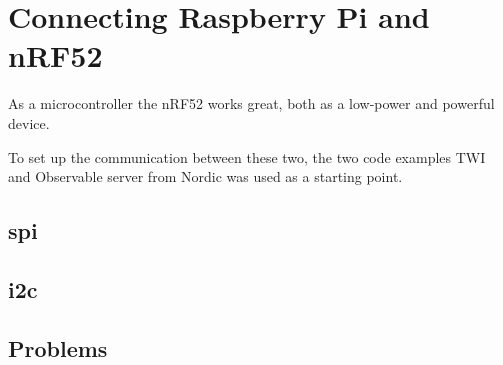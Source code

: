 \section{Connecting Raspberry Pi and nRF52}



As a microcontroller the nRF52 works great, both as a low-power and powerful device. 

To set up the communication between these two, the two code examples TWI and Observable server from Nordic was used as a starting point. 


\subsection{\gls{spi}}



\subsection{\gls{i2c}}


\subsection{Problems}




